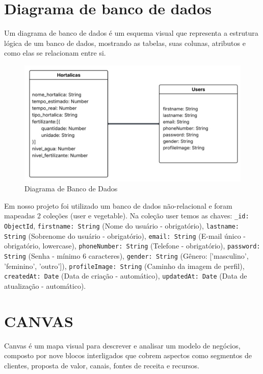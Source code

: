 \documentclass[
  a4paper,
  12pt,
  english,
  brazilian,
]{article}
\begin{document}
\section*{Diagrama de banco de dados}
Um diagrama de banco de dados é um esquema visual que representa a estrutura lógica de um banco de dados, mostrando as tabelas, suas colunas, atributos e como elas se relacionam entre si.

\begin{figure}[H] %
\centering
\caption{Diagrama de Banco de Dados}
\includegraphics[scale=0.5]{Logos/PI - Diagrama de Banco de Dados.jpg}
\end{figure}

Em nosso projeto foi utilizado um banco de dados não-relacional e foram mapeadas 2 coleções (user e vegetable). Na coleção user temos as chaves: \texttt{\_id: ObjectId}, \texttt{firstname: String} (Nome do usuário - obrigatório), \texttt{lastname: String} (Sobrenome do usuário - obrigatório), \texttt{email: String} (E-mail único - obrigatório, lowercase), \texttt{phoneNumber: String} (Telefone - obrigatório), \texttt{password: String} (Senha - mínimo 6 caracteres), \texttt{gender: String} (Gênero: ['masculino', 'feminino', 'outro']), \texttt{profileImage: String} (Caminho da imagem de perfil), \texttt{createdAt: Date} (Data de criação - automático), \texttt{updatedAt: Date} (Data de atualização - automático).

\section*{CANVAS}
Canvas é um mapa visual para descrever e analisar um modelo de negócios, composto por nove blocos interligados que cobrem aspectos como segmentos de clientes, proposta de valor, canais, fontes de receita e recursos.
\end{document}
